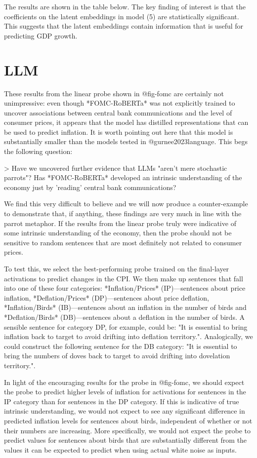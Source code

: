 \documentclass{article}
\theoremstyle{plain}
\theoremstyle{definition}
\theoremstyle{remark}
\begin{document}
The results are shown in the table below. The key finding of interest is that the coefficients on the latent embeddings in model (5) are statistically significant. This suggests that the latent embeddings contain information that is useful for predicting GDP growth.

\section{LLM}

These results from the linear probe shown in @fig-fomc are certainly not unimpressive: even though *FOMC-RoBERTa* was not explicitly trained to uncover associations between central bank communications and the level of consumer prices, it appears that the model has distilled representations that can be used to predict inflation. It is worth pointing out here that this model is substantially smaller than the models tested in @gurnee2023language. This begs the following question: 

> Have we uncovered further evidence that LLMs "aren't mere stochastic parrots"? Has *FOMC-RoBERTa* developed an intrinsic understanding of the economy just by 'reading' central bank communications? 

We find this very difficult to believe and we will now produce a counter-example to demonstrate that, if anything, these findings are very much in line with the parrot metaphor. If the results from the linear probe truly were indicative of some intrinsic understanding of the economy, then the probe should not be sensitive to random sentences that are most definitely not related to consumer prices. 

To test this, we select the best-performing probe trained on the final-layer activations to predict changes in the CPI. We then make up sentences that fall into one of these four categories: *Inflation/Prices* (IP)---sentences about price inflation, *Deflation/Prices* (DP)---sentences about price deflation, *Inflation/Birds* (IB)---sentences about an inflation in the number of birds and *Deflation/Birds* (DB)---sentences about a deflation in the number of birds. A sensible sentence for category DP, for example, could be: "It is essential to bring inflation back to target to avoid drifting into deflation territory.". Analogically, we could construct the following sentence for the DB category: "It is essential to bring the numbers of doves back to target to avoid drifting into dovelation territory.".

In light of the encouraging results for the probe in @fig-fomc, we should expect the probe to predict higher levels of inflation for activations for sentences in the IP category than for sentences in the DP category. If this is indicative of true intrinsic understanding, we would not expect to see any significant difference in predicted inflation levels for sentences about birds, independent of whether or not their numbers are increasing. More specifically, we would not expect the probe to predict values for sentences about birds that are substantially different from the values it can be expected to predict when using actual white noise as inputs.
\end{document}
